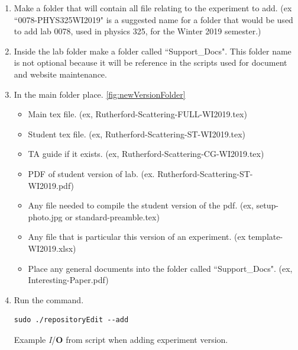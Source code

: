 \documentclass[justified]{book}
\begin{document}
\begin{enumerate}
\item Make a folder that will contain all file relating to the experiment to add. (ex ``0078-PHYS325WI2019" is a suggested name for a folder that would be used to add lab 0078, used in physics 325, for the Winter 2019 semester.)
\item Inside the lab folder make a folder called ``Support\_Docs". This folder name is not optional because it will be reference in the scripts used for document and website maintenance. 
\item In the main folder place. \ref{fig:newVersionFolder}
\begin{itemize}
\item Main tex file. (ex, Rutherford-Scattering-FULL-WI2019.tex)
\item Student tex file. (ex, Rutherford-Scattering-ST-WI2019.tex)
\item TA guide if it exists. (ex, Rutherford-Scattering-CG-WI2019.tex)
\item PDF of student version of lab. (ex. Rutherford-Scattering-ST-WI2019.pdf)
\item Any file needed to compile the student version of the pdf. (ex, setup-photo.jpg or standard-preamble.tex)
\item Any file that is particular this version of an experiment. (ex template-WI2019.xlsx)
\item Place any general documents into the folder called ``Support\_Docs". (ex, Interesting-Paper.pdf)
\end{itemize}

\item Run the command. \label{step:addLab}
\begin{lstlisting}[backgroundcolor = \color{light-gray}]
sudo ./repositoryEdit --add
\end{lstlisting}

Example {\it I}/{\bf O} from script when adding experiment version.


\end{enumerate}
\end{document}
